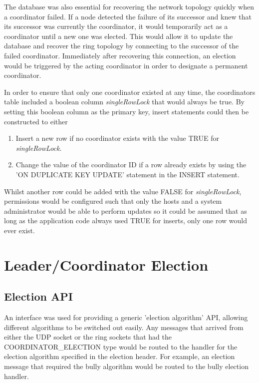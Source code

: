 \documentclass[12pt]{article}
\begin{document}
The database was also essential for recovering the network topology quickly when a coordinator failed. If a node detected the failure of its successor and knew that its successor was currently the coordinator, it would temporarily act as a coordinator until a new one was elected. This would allow it to update the database and recover the ring topology by connecting to the successor of the failed coordinator. Immediately after recovering this connection, an election would be triggered by the acting coordinator in order to designate a permanent coordinator.

In order to ensure that only one coordinator existed at any time, the coordinators table included a boolean column \emph{singleRowLock} that would always be true. By setting this boolean column as the primary key, insert statements could then be constructed to either 
\begin{enumerate}
	\item Insert a new row if no coordinator exists with the value TRUE for \emph{singleRowLock}.
	\item Change the value of the coordinator ID if a row already exists by using the 'ON DUPLICATE KEY UPDATE' statement in the INSERT statement.
\end{enumerate}

Whilst another row could be added with the value FALSE for \emph{singleRowLock}, permissions would be configured such that only the hosts and a system administrator would be able to perform updates so it could be assumed that as long as the application code always used TRUE for inserts, only one row would ever exist. 

\section{Leader/Coordinator Election}

\subsection{Election API}

An interface was used for providing a generic 'election algorithm' API, allowing different algorithms to be switched out easily. Any messages that arrived from either the UDP socket or the ring sockets that had the COORDINATOR\_ELECTION type would be routed to the handler for the election algorithm specified in the election header. For example, an election message that required the bully algorithm would be routed to the bully election handler.
\end{document}
